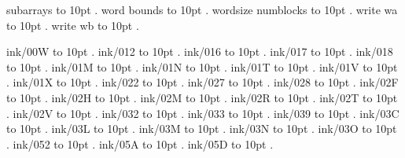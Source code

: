 \smallskip
subarrays \leaders\hbox to 10pt {\hss.\hss}  \hfill {}
\smallskip
word bounds \leaders\hbox to 10pt {\hss.\hss}  \hfill {}
\smallskip
wordsize numblocks \leaders\hbox to 10pt {\hss.\hss}  \hfill {}
\smallskip
write wa \leaders\hbox to 10pt {\hss.\hss}  \hfill {}
\smallskip
write wb \leaders\hbox to 10pt {\hss.\hss}  \hfill {}
\smallskip
\par\endgroup
\bigskip
ink/00W \leaders\hbox to 10pt {\hss.\hss}  \hfill {}
\smallskip
ink/012 \leaders\hbox to 10pt {\hss.\hss}  \hfill {}
\smallskip
ink/016 \leaders\hbox to 10pt {\hss.\hss}  \hfill {}
\smallskip
ink/017 \leaders\hbox to 10pt {\hss.\hss}  \hfill {}
\smallskip
ink/018 \leaders\hbox to 10pt {\hss.\hss}  \hfill {}
\smallskip
ink/01M \leaders\hbox to 10pt {\hss.\hss}  \hfill {}
\smallskip
ink/01N \leaders\hbox to 10pt {\hss.\hss}  \hfill {}
\smallskip
ink/01T \leaders\hbox to 10pt {\hss.\hss}  \hfill {}
\smallskip
ink/01V \leaders\hbox to 10pt {\hss.\hss}  \hfill {}
\smallskip
ink/01X \leaders\hbox to 10pt {\hss.\hss}  \hfill {}
\smallskip
ink/022 \leaders\hbox to 10pt {\hss.\hss}  \hfill {}
\smallskip
ink/027 \leaders\hbox to 10pt {\hss.\hss}  \hfill {}
\smallskip
ink/028 \leaders\hbox to 10pt {\hss.\hss}  \hfill {}
\smallskip
ink/02F \leaders\hbox to 10pt {\hss.\hss}  \hfill {}
\smallskip
ink/02H \leaders\hbox to 10pt {\hss.\hss}  \hfill {}
\smallskip
ink/02M \leaders\hbox to 10pt {\hss.\hss}  \hfill {}
\smallskip
ink/02R \leaders\hbox to 10pt {\hss.\hss}  \hfill {}
\smallskip
ink/02T \leaders\hbox to 10pt {\hss.\hss}  \hfill {}
\smallskip
ink/02V \leaders\hbox to 10pt {\hss.\hss}  \hfill {}
\smallskip
ink/032 \leaders\hbox to 10pt {\hss.\hss}  \hfill {}
\smallskip
ink/033 \leaders\hbox to 10pt {\hss.\hss}  \hfill {}
\smallskip
ink/039 \leaders\hbox to 10pt {\hss.\hss}  \hfill {}
\smallskip
ink/03C \leaders\hbox to 10pt {\hss.\hss}  \hfill {}
\smallskip
ink/03L \leaders\hbox to 10pt {\hss.\hss}  \hfill {}
\smallskip
ink/03M \leaders\hbox to 10pt {\hss.\hss}  \hfill {}
\smallskip
ink/03N \leaders\hbox to 10pt {\hss.\hss}  \hfill {}
\smallskip
ink/03O \leaders\hbox to 10pt {\hss.\hss}  \hfill {}
\smallskip
ink/052 \leaders\hbox to 10pt {\hss.\hss}  \hfill {}
\smallskip
ink/05A \leaders\hbox to 10pt {\hss.\hss}  \hfill {}
\smallskip
ink/05D \leaders\hbox to 10pt {\hss.\hss}  \hfill {}
\smallskip
